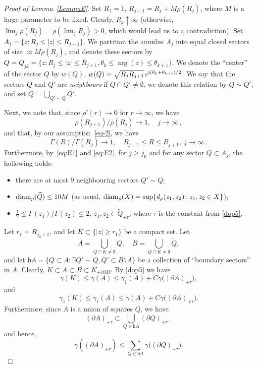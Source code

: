 \documentclass[11pt]{amsart}
\numberwithin{equation}{section}
\begin{document}
\begin{proof}[Proof of Lemma~\ref{LemmaE}]
Set $R_1=1$, $R_{j+1} = R_j + M\rho(R_{j})$, where $M$ is a large parameter to be fixed. Clearly,
$R_j \uparrow \infty$ (otherwise, $\lim_j \rho(R_j) = \rho(\lim_j R_j) >0$,
which would lead us to a contradiction). Set $A_j = \{z\colon R_j\le |z|\le R_{j+1}\}$. We partition the annulus $A_j$ into 
equal closed sectors of size $\simeq M\rho(R_j)$, and denote these sectors
by $Q=Q_{jk}=\{z\colon R_j \le |z| \le R_{j+1}, \theta_k \le \arg(z) \le \theta_{k+1}\}$.
We denote the ``center'' of the sector $Q$ by $w(Q)$,
$w(Q) = \sqrt{R_jR_{j+1}}\, e^{{\rm i} (\theta_k + \theta_{k+1})/2}$.
We say that the sectors $Q$ and $Q'$ are {\em neighbours} if $Q\cap Q'\ne \emptyset$,
we denote this relation by $Q\sim Q'$, and set $\widetilde{Q} =  \bigcup_{Q'\sim Q} Q'$.

Next, we note that, since $\rho'(r)\to 0$ for $r\to\infty$, we have
\begin{equation}\label{eq:E1}
\rho(R_{j+1})/\rho(R_j) \to 1, \quad j\to\infty\,,
\end{equation}
and that, by our assumption~\eqref{eq-2}, we have
\begin{equation}\label{eq:E2}
\Gamma (R)/\Gamma (R_j) \to 1, \quad R_{j-1}\le R \le R_{j+1}, \ j\to\infty\,.
\end{equation}
Furthermore, by~\eqref{eq:E1} and \eqref{eq:E2}, for $j\ge j_0$ and for any sector $Q\subset A_j$,
the hollowing holds:
\begin{itemize}
\item there are at most $9$ neighbouring sectors $Q'\sim Q$;
\item ${\rm diam}_\rho (\widetilde Q) \le 10 M$ (as usual, ${\rm diam}_\rho(X) =
\sup\{d_\rho(z_1, z_2)\colon z_1, z_2\in X\}$);
\item $\tfrac12 \le \Gamma(z_1)/\Gamma (z_2) \le 2$, $z_1, z_2\in \widetilde Q_{+\tau}$, where $\tau$ is the constant from \eqref{dop5}.
\end{itemize}

Let $r_1=R_{j_0+1}$,  
and let $K\subset \{|z|\ge r_1\}$ be a compact set. Let
\[
A=\bigcup_{Q\cap K \ne\emptyset} Q, \quad B=\bigcup_{Q\cap K \ne\emptyset} \widetilde Q,
\]
and let ${\mathsf b} A = \{Q\subset A\colon \exists Q'\sim Q, Q'\subset B\setminus A\}$ be a collection of ``boundary sectors'' in $A$. Clearly, $K\subset A \subset B \subset K_{+10M}$. 
By \eqref{dop5} we have
\[
\gamma (K) \le \gamma (A) \le \gamma_1(A) + C \gamma \bigl( (\partial A)_{+\tau} \bigr),
\]
and
\[
\gamma_1 (K) \le \gamma_1 (A) \le \gamma(A) + C \gamma \bigl( (\partial A)_{+\tau} \bigr).
\]
Furthermore, since $A$ is a union of squares $Q$, we have
\[
(\partial A)_{+\tau} \subset \bigcup_{Q\in {\mathsf b}A} (\partial Q)_{+\tau}\,,
\]
and hence,
\[
\gamma ((\partial A)_{+\tau}) \le \sum_{Q\in {\mathsf b}A} \gamma \bigl( (\partial Q)_{+\tau} \bigr).
\]


\end{proof}
\end{document}
